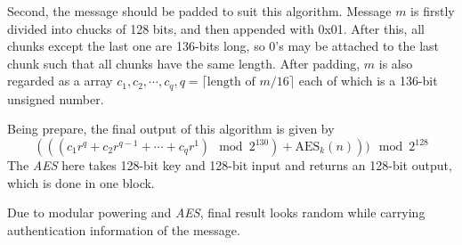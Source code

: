 Second, the message should be padded to suit this algorithm. 
Message $m$ is firstly divided into chucks of 128 bits, 
and then appended with 0x01. 
After this, all chunks except the last one are 136-bits long, so 0's 
may be attached to the last chunk such that all chunks have the same length. 
After padding, $m$ is also regarded as a array $c_1, c_2, \cdots, c_q, 
q=\lceil\text{length of }m/16\rceil$
each of which is a 136-bit unsigned number.

Being prepare, the final output of this algorithm is given by 
$$
(((c_1r^q+c_2r^{q-1}+\cdots+c_qr^1)\mod{2^{130}})+\text{AES}_k(n)))\mod{2^{128}}
$$
The \emph{AES} here takes 128-bit key and 128-bit input and returns an 128-bit output, 
which is done in one block. 

Due to modular powering and \emph{AES}, final result looks random while carrying 
authentication information of the message. 
